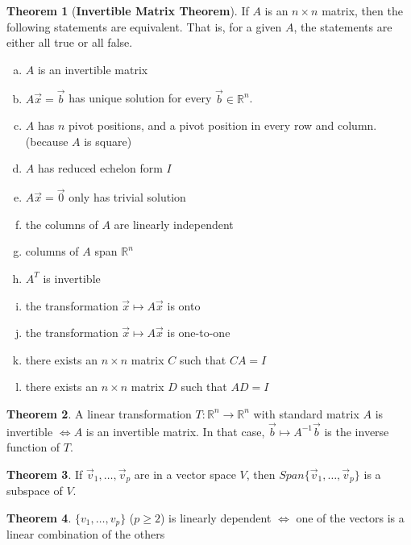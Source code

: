 \documentclass[a4paper,12pt]{article}
\theoremstyle{definition}
\newtheorem{theorem}{Theorem}
\theoremstyle{definition}
\newcommand{\mateq}[3]{#1#2 = #3}
\newcommand{\mateqaxb}{\mateq{A}{\vec{x}}{\vec{b}}}
\newcommand{\mateqaxo}{\mateq{A}{\vec{x}}{\vec{0}}}
\newcommand{\finitevecs}[2]{#1_1,\ldots,#1_#2}
\newcommand{\finitevecsset}[2]{\{\finitevecs{#1}{#2}\}}
\begin{document}
	\begin{theorem}[\textbf{Invertible Matrix Theorem}]
		\label{thm:imt-thm}
		If $A$ is an $n \times n$ matrix, then the following statements are equivalent. That
		is, for a given $A$, the statements are either all true or all false.
		
		\begin{enumerate}[a.]
			\item $A$ is an invertible matrix
			\item $\mateqaxb$ has unique solution for every $\vec{b} \in \mathbb{R}^n$.
			\item $A$ has $n$ pivot positions, and a pivot position in every row and column. (because $A$ is square)
			\item $A$ has reduced echelon form $I$
			\item $\mateqaxo$ only has trivial solution
			\item the columns of $A$ are linearly independent
			\item columns of $A$ span $\mathbb{R}^n$
			\item $A^T$ is invertible
			\item the transformation $\vec{x} \mapsto A\vec{x}$ is onto
			\item the transformation $\vec{x} \mapsto A\vec{x}$ is one-to-one
			\item there exists an $n \times n$ matrix $C$ such that $\mateq{C}{A}{I}$
			\item there exists an $n \times n$ matrix $D$ such that $\mateq{A}{D}{I}$
		\end{enumerate}
	\end{theorem}
	
	\begin{theorem}
		\label{thm:invertible-trans-thm}
		A linear transformation $T: \mathbb{R}^n \rightarrow \mathbb{R}^n$ with standard matrix $A$ is invertible $\Leftrightarrow A$ is an invertible matrix. In that case, $\vec{b} \mapsto A^{-1}\vec{b}$ is the inverse function of $T$.
	\end{theorem}
	
	\begin{theorem}
		\label{thm:span-subspace-thm}
		If $\finitevecs{\vec{v}}{p}$ are in a vector space $V$, then $Span\finitevecsset{\vec{v}}{p}$ is a subspace of $V$.
	\end{theorem}
	
	\begin{theorem}
		\label{thm:lin-dep-vec-set-thm}
		$\finitevecsset{v}{p}$ ($p \geq 2$) is linearly dependent $\Leftrightarrow$ one of the vectors is a linear combination of the others
	\end{theorem}
	
\end{document}
